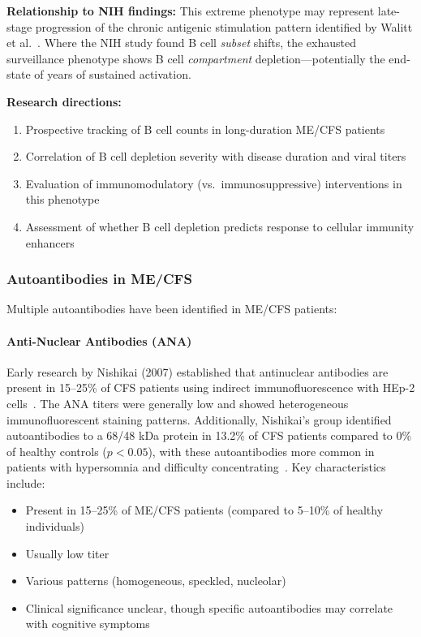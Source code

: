 \begin{speculation}
\textbf{Relationship to NIH findings:}
This extreme phenotype may represent late-stage progression of the chronic antigenic stimulation pattern identified by Walitt et al.~\cite{walitt2024deep}. Where the NIH study found B cell \textit{subset} shifts, the exhausted surveillance phenotype shows B cell \textit{compartment} depletion---potentially the end-state of years of sustained activation.

\textbf{Research directions:}
\begin{enumerate}
    \item Prospective tracking of B cell counts in long-duration ME/CFS patients
    \item Correlation of B cell depletion severity with disease duration and viral titers
    \item Evaluation of immunomodulatory (vs.\ immunosuppressive) interventions in this phenotype
    \item Assessment of whether B cell depletion predicts response to cellular immunity enhancers
\end{enumerate}
\end{speculation}

\subsubsection{Autoantibodies in ME/CFS}

Multiple autoantibodies have been identified in ME/CFS patients:

\paragraph{Anti-Nuclear Antibodies (ANA)}
Early research by Nishikai (2007) established that antinuclear antibodies are present in 15--25\% of CFS patients using indirect immunofluorescence with HEp-2 cells~\cite{Nishikai2007}. The ANA titers were generally low and showed heterogeneous immunofluorescent staining patterns. Additionally, Nishikai's group identified autoantibodies to a 68/48 kDa protein in 13.2\% of CFS patients compared to 0\% of healthy controls ($p < 0.05$), with these autoantibodies more common in patients with hypersomnia and difficulty concentrating~\cite{Nishikai2007}. Key characteristics include:
\begin{itemize}
    \item Present in 15--25\% of ME/CFS patients (compared to 5--10\% of healthy individuals)
    \item Usually low titer
    \item Various patterns (homogeneous, speckled, nucleolar)
    \item Clinical significance unclear, though specific autoantibodies may correlate with cognitive symptoms
\end{itemize}

